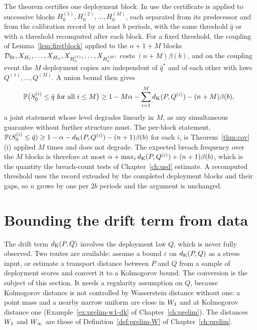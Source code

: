 \documentclass[../../../main.tex]{subfiles}
\begin{document}
\begin{remark}\label{rem:sequence}
The theorem certifies one deployment block. In use the certificate is applied to successive blocks $H_0^{(1)},H_0^{(2)},\dots,H_0^{(M)}$, each separated from its predecessor and from the calibration record by at least $b$ periods, with the same threshold $\hat q$ or with a threshold recomputed after each block. For a fixed threshold, the coupling of Lemma~\ref{lem:firstblock} applied to the $n+1+M$ blocks $\mathcal D_{\mathrm{fit}},X_{H_1},\dots,X_{H_n},X_{H_0^{(1)}},\dots,X_{H_0^{(M)}}$ costs $(n+M)\beta(b)$, and on the coupling event the $M$ deployment copies are independent of $\hat q^*$ and of each other with laws $Q^{(1)},\dots,Q^{(M)}$. A union bound then gives
\[
\mathbb{P}\big(S_0^{(i)}\le\hat q\ \text{for all }i\le M\big)\ge1-M\alpha-\sum_{i=1}^Md_{\mathrm{K}}(P,Q^{(i)})-(n+M)\beta(b),
\]
a joint statement whose level degrades linearly in $M$, as any simultaneous guarantee without further structure must. The per-block statement, $\mathbb{P}(S_0^{(i)}\le\hat q)\ge1-\alpha-d_{\mathrm{K}}(P,Q^{(i)})-(n+1)\beta(b)$ for each $i$, is Theorem~\ref{thm:cov}(i) applied $M$ times and does not degrade. The expected breach frequency over the $M$ blocks is therefore at most $\alpha+\max_id_{\mathrm{K}}(P,Q^{(i)})+(n+1)\beta(b)$, which is the quantity the breach-count tests of Chapter~\ref{ch:usd} estimate. A recomputed threshold uses the record extended by the completed deployment blocks and their gaps, so $n$ grows by one per $2b$ periods and the argument is unchanged.
\end{remark}

\section{Bounding the drift term from data}\label{sec:cert-drift}

The drift term $d_{\mathrm{K}}(P,Q)$ involves the deployment law $Q$, which is never fully observed. Two routes are available: assume a bound $\varepsilon$ on $d_{\mathrm{K}}(P,Q)$ as a stress input, or estimate a transport distance between $P$ and $Q$ from a sample of deployment scores and convert it to a Kolmogorov bound. The conversion is the subject of this section. It needs a regularity assumption on $Q$, because Kolmogorov distance is not controlled by Wasserstein distance without one: a point mass and a nearby narrow uniform are close in $W_1$ and at Kolmogorov distance one (Example~\ref{ex:prelim-w1-dk} of Chapter~\ref{ch:prelim}). The distances $W_1$ and $W_\infty$ are those of Definition~\ref{def:prelim-W} of Chapter~\ref{ch:prelim}.
\end{document}

